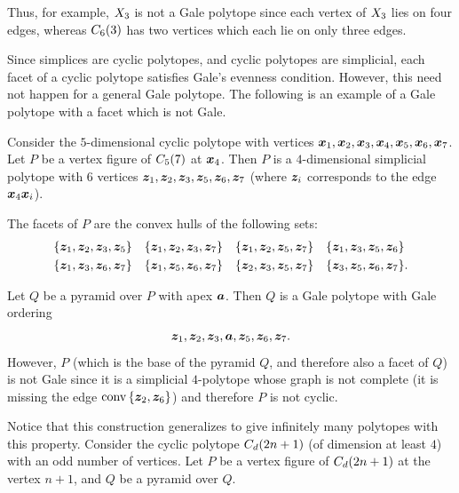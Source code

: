 Thus, for example, \(\xp3\) is not a Gale polytope since each vertex of \(\xp3\) lies on four edges, whereas \(\cyc36\) has two vertices which each lie on only three edges.

Since simplices are cyclic polytopes, and cyclic polytopes are simplicial, each facet of a cyclic polytope satisfies Gale's evenness condition.  However, this need not happen for a general Gale polytope.  The following is an example of a Gale polytope with a facet which is not Gale.

\begin{Example}
    Consider the \(5\)-dimensional cyclic polytope with vertices \(\ve x_1,\ve x_2,\ve x_3,\ve x_4,\ve x_5,\ve x_6,\ve x_7\).  Let \(P\) be a vertex figure of \(\cyc75\) at \(\ve x_4\).  Then \(P\) is a \(4\)-dimensional simplicial polytope with \(6\) vertices \(\ve z_1,\ve z_2,\ve z_3,\ve z_5,\ve z_6,\ve z_7\) (where \(\ve z_i\) corresponds to the edge \(\ve x_4\ve x_i\)).

    The facets of \(P\) are the convex hulls of the following sets:
        \begin{align*}
            \seta{\ve z_1, \ve z_2, \ve z_3, \ve z_5}&&
            \seta{\ve z_1, \ve z_2, \ve z_3, \ve z_7}&&
            \seta{\ve z_1, \ve z_2, \ve z_5, \ve z_7}&&
            \seta{\ve z_1, \ve z_3, \ve z_5, \ve z_6}&\\
            \seta{\ve z_1, \ve z_3, \ve z_6, \ve z_7}&&
            \seta{\ve z_1, \ve z_5, \ve z_6, \ve z_7}&&
            \seta{\ve z_2, \ve z_3, \ve z_5, \ve z_7}&&
            \seta{\ve z_3, \ve z_5, \ve z_6, \ve z_7}&.
        \end{align*}

    Let \(Q\) be a pyramid over \(P\) with apex \(\ve a\).  Then \(Q\) is a Gale polytope with Gale ordering
        \[
            \ve z_1,\ve z_2,\ve z_3,\ve a,\ve z_5,\ve z_6,\ve z_7.
        \]
    However, \(P\) (which is the base of the pyramid \(Q\), and therefore also a facet of \(Q\)) is not Gale since it is a simplicial \(4\)-polytope whose graph is not complete (it is missing the edge \(\conv\seta{\ve z_2,\ve z_6}\)) and therefore \(P\) is not cyclic.

    Notice that this construction generalizes to give infinitely many polytopes with this property.  Consider the cyclic polytope \(\cyc{2n+1}d\) (of dimension at least \(4\)) with an odd number of vertices.  Let \(P\) be a vertex figure of \(\cyc{2n+1}d\) at the vertex \(n+1\), and \(Q\) be a pyramid over \(Q\).
\end{Example}

